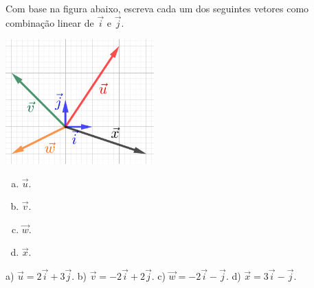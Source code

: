 \begin{exer}\label{cap_base_sec_comblin:exer:comblin_exer_geo}
  Com base na figura abaixo, escreva cada um dos seguintes vetores como combinação linear de $\vec{i}$ e $\vec{j}$.

  \begin{center}
    \includegraphics[width=2.25in]{cap_base/dados/fig_comblin_exer_geo/fig.jpg}
  \end{center}

  \begin{enumerate}[a)]
    \item $\vec{u}$.
    \item $\vec{v}$.
    \item $\vec{w}$.
    \item $\vec{x}$.
  \end{enumerate}

\end{exer}
\begin{resp}
  a) $\vec{u} = 2\vec{i} + 3\vec{j}$. b) $\vec{v} = -2\vec{i} + 2\vec{j}$. c) $\vec{w} = -2\vec{i} - \vec{j}$. d) $\vec{x} = 3\vec{i} - \vec{j}$.
\end{resp}


